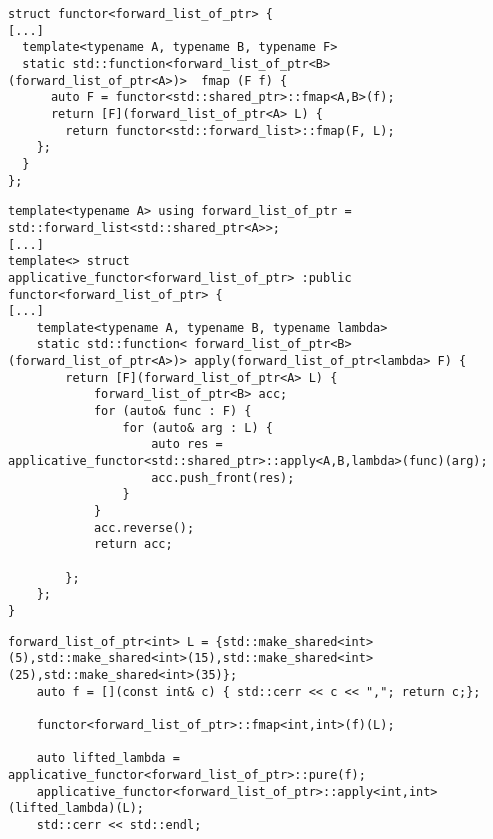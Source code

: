 \documentclass[12pt,fleqn]{article}
\begin{document}
%
%
%
\begin{minipage}{\linewidth}
\begin{lstlisting}[caption=fmap implementation for a list of shared pointers, label=fmap_ptr_lst]
struct functor<forward_list_of_ptr> {
[...]
  template<typename A, typename B, typename F>
  static std::function<forward_list_of_ptr<B> (forward_list_of_ptr<A>)>  fmap (F f) {
	  auto F = functor<std::shared_ptr>::fmap<A,B>(f);
	  return [F](forward_list_of_ptr<A> L) {
		return functor<std::forward_list>::fmap(F, L);
    };
  }
};
\end{lstlisting}
\end{minipage}
%
%
%


%
%
%
\begin{minipage}{\linewidth}
\begin{lstlisting}[caption=applicative functor for a list of shared pointers, label=apf_ptr_list]
template<typename A> using forward_list_of_ptr = std::forward_list<std::shared_ptr<A>>;
[...]
template<> struct 
applicative_functor<forward_list_of_ptr> :public functor<forward_list_of_ptr> {
[...]
    template<typename A, typename B, typename lambda>
    static std::function< forward_list_of_ptr<B> (forward_list_of_ptr<A>)> apply(forward_list_of_ptr<lambda> F) {
		return [F](forward_list_of_ptr<A> L) {
			forward_list_of_ptr<B> acc;
			for (auto& func : F) {
				for (auto& arg : L) {
					auto res = applicative_functor<std::shared_ptr>::apply<A,B,lambda>(func)(arg);
					acc.push_front(res);
				}
			} 
			acc.reverse();
			return acc;
			
		};
	};
}	
\end{lstlisting}
\end{minipage}
%
%
%


%
%
%
\begin{minipage}{\linewidth}
\begin{lstlisting}[caption=example for list of pointers, label=examp_list_ptr]
    forward_list_of_ptr<int> L = {std::make_shared<int>(5),std::make_shared<int>(15),std::make_shared<int>(25),std::make_shared<int>(35)};
    auto f = [](const int& c) { std::cerr << c << ","; return c;};

    functor<forward_list_of_ptr>::fmap<int,int>(f)(L);

    auto lifted_lambda = applicative_functor<forward_list_of_ptr>::pure(f);
    applicative_functor<forward_list_of_ptr>::apply<int,int>(lifted_lambda)(L);
	std::cerr << std::endl;
\end{lstlisting}
\end{minipage}
%
%
%
\end{document}
